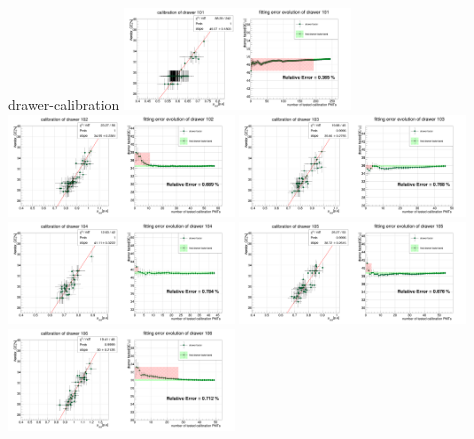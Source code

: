 \documentclass[11pt,compress,xcolor=x11names,UTF8]{beamer}
\begin{document}
\begin{frame}{drawer-calibration}
\vspace{-.5cm}
\includegraphics[width=0.45\textwidth]{sta101-0} 
\includegraphics[width=0.45\textwidth]{sta101-1} 
\includegraphics[width=0.45\textwidth]{sta101-2} 
\includegraphics[width=0.45\textwidth]{sta101-3} 
\includegraphics[width=0.45\textwidth]{sta101-4} 
\includegraphics[width=0.45\textwidth]{sta101-5} 
\end{frame}
\end{document}
